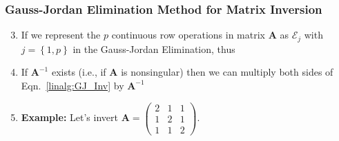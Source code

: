 \documentclass[10pt,compress,handout,ignorenonframetext]{beamer}
\begin{document}
\begin{frame}
  \frametitle{Gauss-Jordan Elimination Method for Matrix Inversion} 
  \begin{enumerate}
  \setcounter{enumi}{2}
     \item <1-> If we represent the $p$ continuous row operations in matrix $\bm{A}$ as $\mathcal{E}_{j}$ with $j=\left\{1,p\right\}$ in the Gauss-Jordan Elimination, thus
     \item <3-> If $\bm{A}^{-1}$ exists (i.e., if $\bm{A}$ is nonsingular) then we can multiply both sides of Eqn.~\ref{linalg:GJ_Inv} by $\bm{A}^{-1}$
     \item <5-> {\bf Example:} Let's invert $\bm{A} = \begin{pmatrix}2 & 1 & 1 \\ 1 & 2 & 1 \\ 1 & 1 & 2\end{pmatrix}$.
          
  \end{enumerate}
\end{frame}
\end{document}
